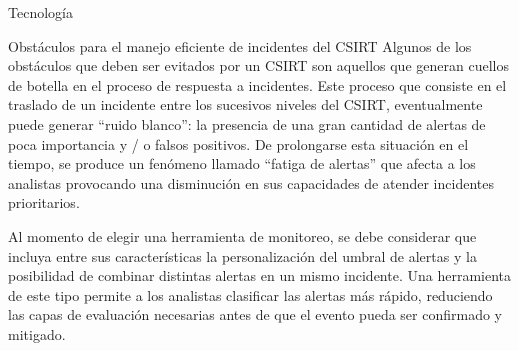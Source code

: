 \begin{section}{Tecnología}
        \begin{subsection}{Obstáculos para el manejo eficiente de incidentes del CSIRT}
        Algunos de los obstáculos que deben ser evitados por un CSIRT son aquellos que generan cuellos de botella en el proceso de respuesta a incidentes.  Este proceso que consiste en el traslado de un incidente entre los sucesivos niveles del CSIRT, eventualmente puede generar “ruido blanco”: la presencia de una gran cantidad de alertas de poca importancia y / o falsos positivos. De prolongarse esta situación en el tiempo, se produce un fenómeno llamado “fatiga de alertas” que afecta a los analistas provocando una disminución en sus capacidades de atender incidentes prioritarios. \par
        Al momento de elegir una herramienta de monitoreo, se debe considerar que incluya entre sus características la personalización del umbral de alertas y la posibilidad de combinar distintas alertas en un mismo incidente. Una herramienta de este tipo permite a los analistas clasificar las alertas más rápido, reduciendo las capas de evaluación necesarias antes de que el evento pueda ser confirmado y mitigado. 
        \end{subsection}
   \end{section}
      

